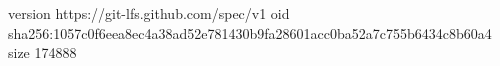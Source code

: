 version https://git-lfs.github.com/spec/v1
oid sha256:1057c0f6eea8ec4a38ad52e781430b9fa28601acc0ba52a7c755b6434c8b60a4
size 174888
